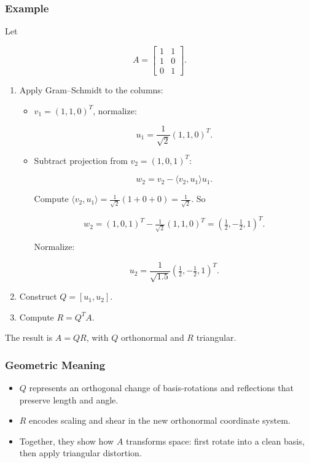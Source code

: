 \documentclass[
  letterpaper,
  DIV=11,
  numbers=noendperiod]{scrreprt}
\providecommand{\tightlist}{%
  \setlength{\itemsep}{0pt}\setlength{\parskip}{0pt}}
\begin{document}
\subsubsection{Example}\label{example-3}

Let

\[
A = \begin{bmatrix} 1 & 1 \\ 1 & 0 \\ 0 & 1 \end{bmatrix}.
\]

\begin{enumerate}
\def\labelenumi{\arabic{enumi}.}
\item
  Apply Gram--Schmidt to the columns:

  \begin{itemize}
  \item
    \(v_1 = (1,1,0)^T\), normalize:

    \[
    u_1 = \frac{1}{\sqrt{2}}(1,1,0)^T.
    \]
  \item
    Subtract projection from \(v_2=(1,0,1)^T\):

    \[
    w_2 = v_2 - \langle v_2,u_1\rangle u_1.
    \]

    Compute
    \(\langle v_2,u_1\rangle = \tfrac{1}{\sqrt{2}}(1+0+0)=\tfrac{1}{\sqrt{2}}\).
    So

    \[
    w_2 = (1,0,1)^T - \tfrac{1}{\sqrt{2}}(1,1,0)^T = \left(\tfrac{1}{2}, -\tfrac{1}{2}, 1\right)^T.
    \]

    Normalize:

    \[
    u_2 = \frac{1}{\sqrt{1.5}} \left(\tfrac{1}{2}, -\tfrac{1}{2}, 1\right)^T.
    \]
  \end{itemize}
\item
  Construct \(Q = [u_1, u_2]\).
\item
  Compute \(R = Q^T A\).
\end{enumerate}

The result is \(A = QR\), with \(Q\) orthonormal and \(R\) triangular.

\subsubsection{Geometric Meaning}\label{geometric-meaning-21}

\begin{itemize}
\tightlist
\item
  \(Q\) represents an orthogonal change of basis-rotations and
  reflections that preserve length and angle.
\item
  \(R\) encodes scaling and shear in the new orthonormal coordinate
  system.
\item
  Together, they show how \(A\) transforms space: first rotate into a
  clean basis, then apply triangular distortion.
\end{itemize}
\end{document}
